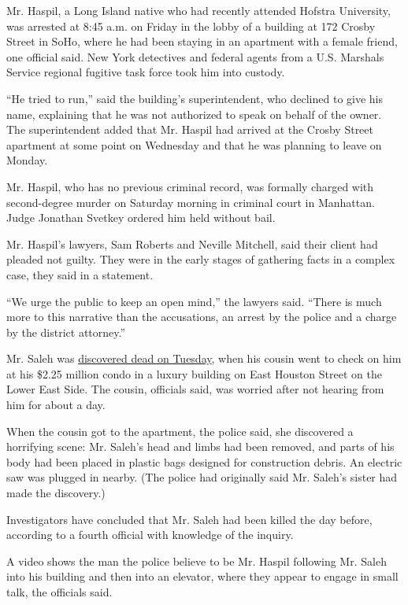 Mr. Haspil, a Long Island native who had recently attended Hofstra
University, was arrested at 8:45 a.m. on Friday in the lobby of a
building at 172 Crosby Street in SoHo, where he had been staying in an
apartment with a female friend, one official said. New York detectives
and federal agents from a U.S. Marshals Service regional fugitive task
force took him into custody.

``He tried to run,'' said the building's superintendent, who declined to
give his name, explaining that he was not authorized to speak on behalf
of the owner. The superintendent added that Mr. Haspil had arrived at
the Crosby Street apartment at some point on Wednesday and that he was
planning to leave on Monday.

Mr. Haspil, who has no previous criminal record, was formally charged
with second-degree murder on Saturday morning in criminal court in
Manhattan. Judge Jonathan Svetkey ordered him held without bail.

Mr. Haspil's lawyers, Sam Roberts and Neville Mitchell, said their
client had pleaded not guilty. They were in the early stages of
gathering facts in a complex case, they said in a statement.

``We urge the public to keep an open mind,'' the lawyers said. ``There
is much more to this narrative than the accusations, an arrest by the
police and a charge by the district attorney.''

Mr. Saleh was
\href{https://www.nytimes3xbfgragh.onion/2020/07/15/nyregion/fahim-saleh-lower-east-side-murder.html?module=inline}{discovered
dead on Tuesday}, when his cousin went to check on him at his \$2.25
million condo in a luxury building on East Houston Street on the Lower
East Side. The cousin, officials said, was worried after not hearing
from him for about a day.

When the cousin got to the apartment, the police said, she discovered a
horrifying scene: Mr. Saleh's head and limbs had been removed, and parts
of his body had been placed in plastic bags designed for construction
debris. An electric saw was plugged in nearby. (The police had
originally said Mr. Saleh's sister had made the discovery.)

Investigators have concluded that Mr. Saleh had been killed the day
before, according to a fourth official with knowledge of the inquiry.

A video shows the man the police believe to be Mr. Haspil following Mr.
Saleh into his building and then into an elevator, where they appear to
engage in small talk, the officials said.

